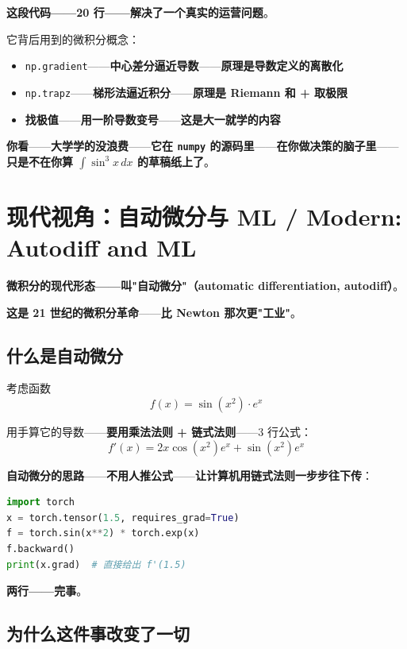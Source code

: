 \textbf{这段代码——\textbf{20 行}——\textbf{解决了一个真实的运营问题}}。

它背后用到的微积分概念：

\begin{itemize}
\item \texttt{np.gradient}——\textbf{中心差分逼近导数}——\textbf{原理是导数定义的离散化}
\item \texttt{np.trapz}——\textbf{梯形法逼近积分}——\textbf{原理是 Riemann 和 + 取极限}
\item \textbf{找极值}——\textbf{用一阶导数变号}——\textbf{这是大一就学的内容}
\end{itemize}

\textbf{你看}——\textbf{大学学的没浪费}——\textbf{它在 \texttt{numpy} 的源码里}——\textbf{在你做决策的脑子里}——\textbf{只是不在你算 $\int \sin^3 x \, dx$ 的草稿纸上了}。

\section{现代视角：自动微分与 ML / Modern: Autodiff and ML}

\textbf{微积分的现代形态——叫"自动微分"（automatic differentiation, autodiff）}。

\textbf{这是 21 世纪的微积分革命}——\textbf{比 Newton 那次更"工业"}。

\subsection{什么是自动微分}

考虑函数
\[
f(x) = \sin(x^2) \cdot e^x
\]

用手算它的导数——\textbf{要用乘法法则 + 链式法则}——3 行公式：
\[
f'(x) = 2x \cos(x^2) e^x + \sin(x^2) e^x
\]

\textbf{自动微分的思路}——\textbf{不用人推公式}——\textbf{让计算机用链式法则一步步往下传}：

\begin{lstlisting}[language=Python]
import torch
x = torch.tensor(1.5, requires_grad=True)
f = torch.sin(x**2) * torch.exp(x)
f.backward()
print(x.grad)  # 直接给出 f'(1.5)
\end{lstlisting}

\textbf{两行——完事}。

\subsection{为什么这件事改变了一切}

